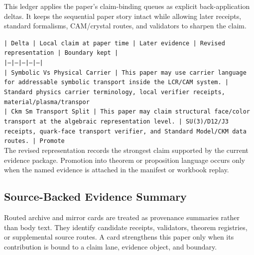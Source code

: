 \documentclass[11pt]{article}
\begin{document}
This ledger applies the paper's claim-binding queues as explicit back-application
deltas. It keeps the sequential paper story intact while allowing later
receipts, standard formalisms, CAM/crystal routes, and validators to sharpen the
claim.

\noindent\texttt{| Delta | Local claim at paper time | Later evidence | Revised representation | Boundary kept |}\\
\noindent\texttt{|---|---|---|---|---|}\\
\noindent\texttt{| Symbolic Vs Physical Carrier | This paper may use carrier language for addressable symbolic transport inside the LCR/CAM system. | Standard physics carrier terminology, local verifier receipts, material/plasma/transpor}\\
\noindent\texttt{| Ckm Sm Transport Split | This paper may claim structural face/color transport at the algebraic representation level. | SU(3)/D12/J3 receipts, quark-face transport verifier, and Standard Model/CKM data routes. | Promote}\\

The revised representation records the strongest claim supported by the current evidence package. Promotion into theorem or proposition language occurs only when the named evidence is attached in the manifest or workbook replay.

\subsection*{Source-Backed Evidence Summary}

Routed archive and mirror cards are treated as provenance summaries rather than
body text. They identify candidate receipts, validators, theorem registries, or
supplemental source routes. A card strengthens this paper only when its
contribution is bound to a claim lane, evidence object, and boundary.
\end{document}
